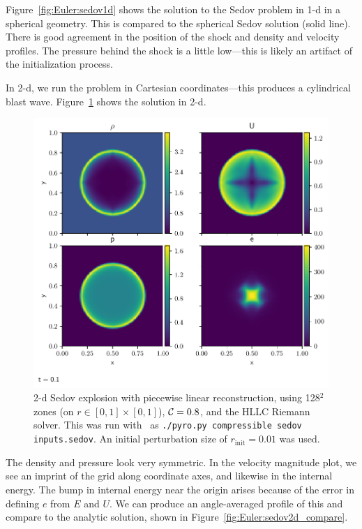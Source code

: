 Figure~\ref{fig:Euler:sedov1d} shows the solution to the Sedov problem
in 1-d in a spherical geometry.  This is compared to the spherical
Sedov solution (solid line). There is good agreement in the position of the
shock and density and velocity profiles.  The pressure behind the shock
is a little low---this is likely an artifact of the initialization process.

In 2-d, we run the problem in Cartesian coordinates---this produces a cylindrical
blast wave.  Figure~\ref{fig:Euler:sedov2d} shows the solution in 2-d.
\begin{figure}[t]
\centering
\includegraphics[width=0.85\linewidth]{sedov_pyro}
\caption[2-d cylindrical Sedov problem]{\label{fig:Euler:sedov2d} 2-d Sedov explosion with
  piecewise linear reconstruction, using 128$^2$ zones (on $r \in
  [0,1]\times[0,1]$), ${\mathcal{C}} = 0.8$, and the HLLC Riemann solver.  This was run
  with \pyro\ as {\tt ./pyro.py compressible sedov inputs.sedov}.  An initial
  perturbation size of $r_\mathrm{init} = 0.01$ was used.}
\end{figure}
The density and pressure look very symmetric.  In the velocity magnitude
plot, we see an imprint of the grid along coordinate axes, and likewise
in the internal energy.  The bump in internal energy near the origin arises
because of the error in defining $e$ from $E$ and $U$.  We can produce an angle-averaged
profile of this and compare to the analytic solution, shown in Figure~\ref{fig:Euler:sedov2d_compare}.

